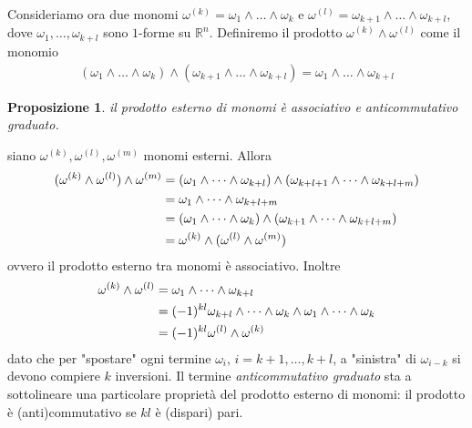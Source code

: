 \documentclass[twoside, 11pt]{amsbook}
\makeatletter
\newcommand{\0}{{(0)}}
\newcommand{\3}{{(3)}}
\theoremstyle{colonplain}
\newtheorem{prop}[thm]{Proposizione}
\theoremstyle{colondefinition}
\theoremstyle{colonremark}
\numberwithin{equation}{chapter}
\renewcommand{\proofname}{Dimostrazione}
\renewenvironment{proof}[1][\proofname]{\par
  \pushQED{\qed}%
  \normalfont \topsep6\p@\@plus6\p@\relax
  \trivlist
  \item[\hskip\labelsep\bfseries #1:]\ignorespaces
}{%
  \popQED\endtrivlist\@endpefalse
}
\makeatother
\begin{document}
Consideriamo ora due monomi $\omega^{(k)} = \omega_1 \wedge \dots \wedge \omega_k$ e $\omega^{(l)} = \omega_{k + 1} \wedge \dots \wedge \omega_{k + l}$, dove $\omega_1, \dots, \omega_{k + l}$ sono $1$-forme su $\mathbb{R}^n$. Definiremo il prodotto $\omega^{(k)} \wedge \omega^{(l)}$ come il monomio 
\begin{align}
    (\omega_1 \wedge \dots \wedge \omega_k) \wedge (\omega_{k + 1} \wedge \dots \wedge \omega_{k + l}) = \omega_1 \wedge \dots \wedge \omega_{k + l} 
\end{align}
\begin{prop}\label{Assoc&CommExtProd} il prodotto esterno di monomi è associativo e anticommutativo graduato.
\end{prop}
\begin{proof} siano $\omega^{(k)}, \omega^{(l)}, \omega^{(m)}$ monomi esterni. Allora 
\begin{align}
    (\omega^{(k)} \wedge \omega^{(l)}) \wedge \omega^{(m)} &= (\omega_1 \wedge \dots \wedge \omega_{k + l}) \wedge (\omega_{k + l + 1} \wedge \dots \wedge \omega_{k + l + m}) \notag \\
    &= \omega_1 \wedge \dots \wedge \omega_{k + l + m} \notag \\
    &= (\omega_1 \wedge \dots \wedge \omega_{k}) \wedge (\omega_{k + 1} \wedge \dots \wedge \omega_{k + l + m}) \notag \\
    &= \omega^{(k)} \wedge (\omega^{(l)} \wedge \omega^{(m)}) \notag
\end{align}
ovvero il prodotto esterno tra monomi è associativo. Inoltre 
\begin{align}
    \omega^{(k)} \wedge \omega^{(l)} &= \omega_1 \wedge \dots \wedge \omega_{k + l} \notag \\
    &= (-1)^{kl}\omega_{k + l} \wedge \dots \wedge \omega_k \wedge \omega_1 \wedge \dots \wedge \omega_k \notag \\
    &= (-1)^{kl}\omega^{(l)} \wedge \omega^{(k)} \notag
\end{align}
dato che per "spostare" ogni termine $\omega_i$, $i = k + 1, \dots, k + l$, a "sinistra" di $\omega_{i - k}$ si devono compiere $k$ inversioni.
\end{proof}
Il termine \textit{anticommutativo graduato} sta a sottolineare una particolare proprietà del prodotto esterno di monomi: il prodotto è (anti)commutativo se $kl$ è (dispari) pari.
\end{document}
